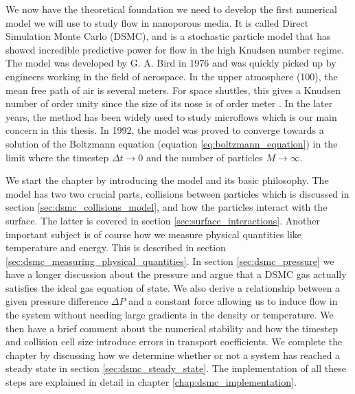 We now have the theoretical foundation we need to develop the first numerical model we will use to study flow in nanoporous media. It is called Direct Simulation Monte Carlo (DSMC), and is a stochastic particle model that has showed incredible predictive power for flow in the high Knudsen number regime. The model was developed by G. A. Bird in 1976 and was quickly picked up by engineers working in the field of aerospace. In the upper atmosphere (\unit{100}{\kilo\meter}), the mean free path of air is several meters. For space shuttles, this gives a Knudsen number of order unity since the size of its nose is of order meter \cite{alexander1997direct}. In the later years, the method has been widely used to study microflows which is our main concern in this thesis. In 1992, the model was proved to converge towards a solution of the Boltzmann equation (equation \eqref{eq:boltzmann_equation}) in the limit where the timestep $\Delta t\rightarrow 0$ and the number of particles $M\rightarrow \infty$.

We start the chapter by introducing the model and its basic philosophy. The model has two two crucial parts, collisions between particles which is discussed in section \ref{sec:dsmc_collisions_model}, and how the particles interact with the surface. The latter is covered in section \ref{sec:surface_interactions}. Another important subject is of course how we measure physical quantities like temperature and energy. This is described in section \ref{sec:dsmc_measuring_physical_quantities}. In section \ref{sec:dsmc_pressure} we have a longer discussion about the pressure and argue that a DSMC gas actually satisfies the ideal gas equation of state. We also derive a relationship between a given pressure difference $\Delta P$ and a constant force allowing us to induce flow in the system without needing large gradients in the density or temperature. We then have a brief comment about the numerical stability and how the timestep and collision cell size introduce errors in transport coefficients. We complete the chapter by discussing how we determine whether or not a system has reached a steady state in section \ref{sec:dsmc_steady_state}. The implementation of all these steps are explained in detail in chapter \ref{chap:dsmc_implementation}.